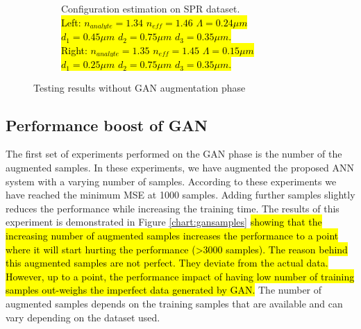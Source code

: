 \documentclass[journal]{IEEEtran}
\begin{document}
\begin{figure}
\begin{subfigure}{\textwidth}
		\captionsetup{justification=centering}
		\caption{Configuration estimation on SPR dataset.
		\\\hl{Left: $ n_{analyte} = 1.34 $ $ n_{eff} = 1.46$ $ \Lambda = 0.24 \mu m$ $ d_1 = 0.45 \mu m $ $ d_2= 0.75 \mu m$ $ d_3 = 0.35 \mu m $.}\\ \hl{Right: $ n_{analyte} = 1.35 $	$ n_{eff} = 1.45 $ $ \Lambda = 0.15 \mu m $ $ d_1 = 0.25 \mu m $ $ d_2= 0.75 \mu m $ $ d_3 = 0.35 \mu m  $.}		
		  }
	\end{subfigure}
	\caption{Testing results without GAN augmentation phase}
	\label{chart:perfnoaug}
\end{figure}


\subsection{Performance boost of GAN}

The first set of experiments performed on the GAN phase is the number of the augmented samples. In these experiments, we have augmented the proposed ANN system with a varying number of samples. According to these experiments we have reached the minimum MSE at 1000 samples. Adding further samples slightly reduces the performance while increasing the training time. The results of this experiment is demonstrated in Figure \ref{chart:gansamples} \hl{showing that the increasing number of augmented samples increases the performance to a point where it will start hurting the performance (>3000 samples). The reason behind this augmented samples are not perfect. They deviate from the actual data. However, up to a point, the performance impact of having low number of training samples out-weighs the imperfect data generated by GAN.} The number of augmented samples depends on the training samples that are available and can vary depending on the dataset used. 
\end{document}
